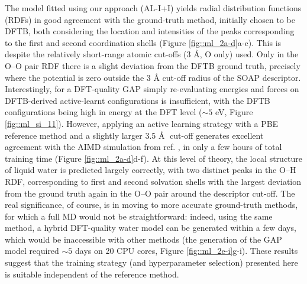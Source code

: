 \documentclass[../../main.tex]{subfiles}
\begin{document}
The model fitted using our approach (AL-I+I) yields radial distribution functions (RDFs) in good agreement with the ground-truth method, initially chosen to be DFTB, both considering the location and intensities of the peaks corresponding to the first and second coordination shells (Figure \ref{fig::ml_2a-d}a-c). This is despite the relatively short-range atomic cut-offs (3 \AA, O only) used. Only in the O–O pair RDF there is a slight deviation from the DFTB ground truth, precisely where the potential is zero outside the 3 Å cut-off radius of the SOAP descriptor. Interestingly, for a DFT-quality GAP simply re-evaluating energies and forces on DFTB-derived active-learnt configurations is insufficient, with the DFTB configurations being high in energy at the DFT level ($\sim5$ eV, Figure \ref{fig::ml_si_11}). However, applying an active learning strategy with a PBE reference method and a slightly larger 3.5 \AA$\;$ cut-off generates excellent agreement with the AIMD simulation from ref. \cite{Zheng2018}, in only a few hours of total training time (Figure \ref{fig::ml_2a-d}d-f). At this level of theory, the local structure of liquid water is predicted largely correctly, with two distinct peaks in the O--H RDF, corresponding to first and second solvation shells with the largest deviation from the ground truth again in the O--O pair around the descriptor cut-off. The real significance, of course, is in moving to more accurate ground-truth methods, for which a full MD would not be straightforward: indeed, using the same method, a hybrid DFT-quality water model can be generated within a few days, which would be inaccessible with other methods (the generation of the GAP model required $\sim5$ days on 20 CPU cores, Figure \ref{fig::ml_2e-i}g-i). These results suggest that the training strategy (and hyperparameter selection) presented here is suitable independent of the reference method.
\end{document}
